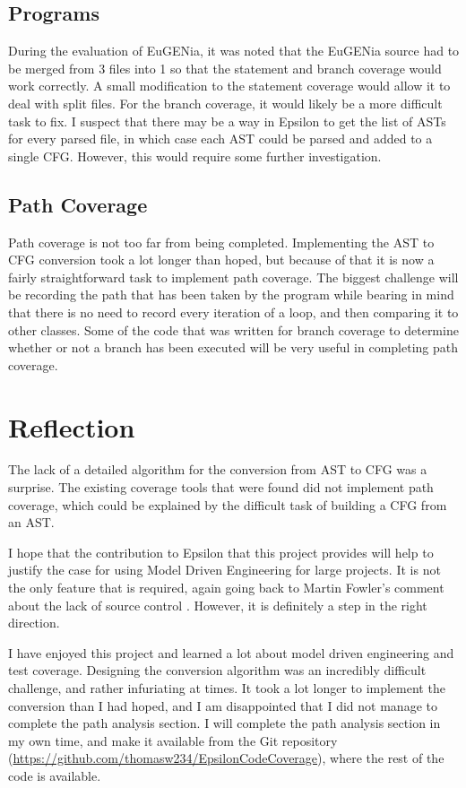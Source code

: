 \subsection{Programs}

During the evaluation of EuGENia, it was noted that the EuGENia source had to be merged from 3 files into 1 so that the statement and branch coverage would work correctly. A small modification to the statement coverage would allow it to deal with split files. For the branch coverage, it would likely be a more difficult task to fix. I suspect that there may be a way in Epsilon to get the list of ASTs for every parsed file, in which case each AST could be parsed and added to a single CFG. However, this would require some further investigation.

\subsection{Path Coverage}

Path coverage is not too far from being completed. Implementing the AST to CFG conversion took a lot longer than hoped, but because of that it is now a fairly straightforward task to implement path coverage. The biggest challenge will be recording the path that has been taken by the program while bearing in mind that there is no need to record every iteration of a loop, and then comparing it to other classes. Some of the code that was written for branch coverage to determine whether or not a branch has been executed will be very useful in completing path coverage.

\section{Reflection}

The lack of a detailed algorithm for the conversion from AST to CFG was a surprise. The existing coverage tools that were found did not implement path coverage, which could be explained by the difficult task of building a CFG from an AST.

I hope that the contribution to Epsilon that this project provides will help to justify the case for using Model Driven Engineering for large projects. It is not the only feature that is required, again going back to Martin Fowler's comment about the lack of source control \cite{fowlerMDE}. However, it is definitely a step in the right direction.

I have enjoyed this project and learned a lot about model driven engineering and test coverage. Designing the conversion algorithm was an incredibly difficult challenge, and rather infuriating at times. It took a lot longer to implement the conversion than I had hoped, and I am disappointed that I did not manage to complete the path analysis section. I will complete the path analysis section in my own time, and make it available from the Git repository (\url{https://github.com/thomasw234/EpsilonCodeCoverage}), where the rest of the code is available.